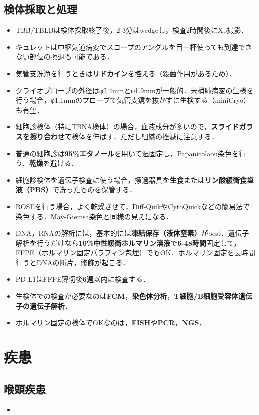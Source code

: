 \subsection{検体採取と処理}
\begin{itemize}

\item TBB/TBLBは検体採取終了後，2-3分はwedgeし，検査2時間後にXp撮影．
\item キュレットは中枢気道病変でスコープのアングルを目一杯使っても到達できない部位の擦過も可能である．
\item 気管支洗浄を行うときは\textbf{リドカイン}を控える（殺菌作用があるため）．
\item クライオプローブの外径はφ2.4mmとφ1.9mmが一般的．末梢肺病変の生検を行う場合，φ1.1mmのプローブで気管支鏡を抜かずに生検する（miniCryo）も有望．
\item 細胞診検体（特にTBNA検体）の場合，血液成分が多いので，\textbf{スライドガラスを擦り合わせて}検体を伸ばす．ただし組織の挫滅に注意する．
\item 普通の細胞診は\textbf{95\%エタノール}を用いて湿固定し，Papanicolaou染色を行う．\textbf{乾燥}を避ける．
\item 細胞診検体を遺伝子検査に使う場合，擦過器具を\textbf{生食}または\textbf{リン酸緩衝食塩液（PBS）}で洗ったものを保管する．
\item ROSEを行う場合，よく乾燥させて，Diff-QuikやCytoQuickなどの簡易法で染色する．May-Giemsa染色と同様の見えになる．
\item DNA，RNAの解析には，基本的には\textbf{凍結保存（液体窒素）}がbest．遺伝子解析を行うだけなら\textbf{10\%中性緩衝ホルマリン溶液}で\textbf{6-48時間}固定して，FFPE（ホルマリン固定パラフィン包埋）でもOK．ホルマリン固定を長時間行うとDNAの断片，修飾が起こる．
\item PD-L1はFFPE薄切後\textbf{6週}以内に検査する．
\item 生検体での検査が必要なのは\textbf{FCM}，\textbf{染色体分析}，\textbf{T細胞/B細胞受容体遺伝子の遺伝子解析}．
\item ホルマリン固定の検体でOKなのは，\textbf{FISH}や\textbf{PCR}，\textbf{NGS}．



\end{itemize}
\newpage


\section{疾患}
\subsection{喉頭疾患}
\begin{itemize}

\item 

\end{itemize}



